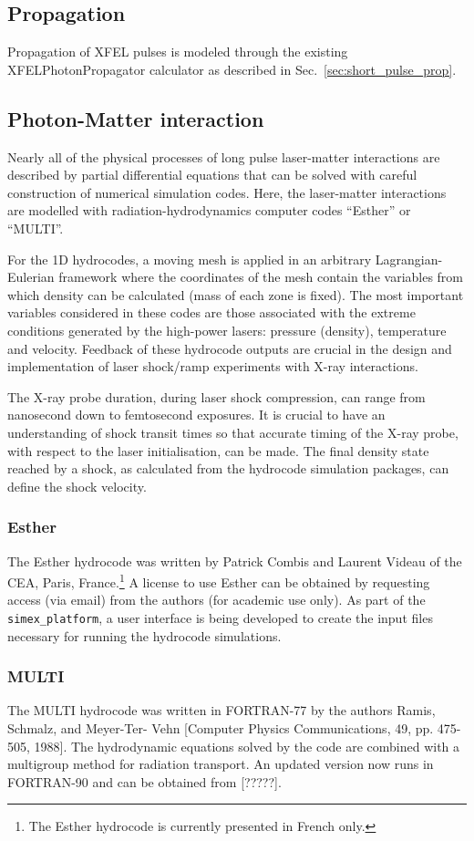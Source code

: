 \documentclass[a4paper]{article}
\begin{document}
\subsection{Propagation}
Propagation of XFEL pulses is modeled through the existing XFELPhotonPropagator calculator as described in Sec.~\ref{sec:short_pulse_prop}.
\subsection{Photon-Matter interaction}
Nearly all of the physical processes of long pulse laser-matter interactions are described by partial differential equations that can be solved with careful construction of numerical simulation codes. Here, the laser-matter interactions are modelled with radiation-hydrodynamics computer codes ``Esther'' or ``MULTI''.

For the 1D hydrocodes, a moving mesh is applied in an arbitrary Lagrangian-Eulerian framework where the coordinates of the mesh contain the variables from which density can be calculated (mass of each zone is fixed). The most important variables considered in these codes are those associated with the extreme conditions generated by the high-power lasers: pressure (density), temperature and velocity. Feedback of these hydrocode outputs are crucial in the design and implementation of laser shock/ramp experiments with X-ray interactions.

The X-ray probe duration, during laser shock compression, can range from nanosecond down to femtosecond exposures. It is crucial to have an understanding of shock transit times so that accurate timing of the X-ray probe, with respect to the laser initialisation, can be made. The final density state reached by a shock, as calculated from the hydrocode simulation packages, can define the shock velocity.

\subsubsection{Esther}
The Esther hydrocode was written by Patrick Combis and Laurent Videau of the CEA, Paris, France.\footnote{The Esther hydrocode is currently presented in French only.} A license to use Esther can be obtained by requesting access (via email) from the authors (for academic use only). As part of the \texttt{simex\_platform}, a user interface is being developed to create the input files necessary for running the hydrocode simulations.

\subsubsection{MULTI}
The MULTI hydrocode was written in FORTRAN-77 by the authors Ramis, Schmalz, and Meyer-Ter-	Vehn [Computer Physics Communications, 49, pp. 475-505, 1988]. The hydrodynamic equations solved by the code are combined with a multigroup method for radiation transport. An updated version now runs in FORTRAN-90 and can be obtained from [?????].
\end{document}
